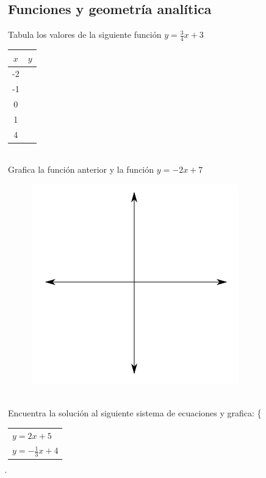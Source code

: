 \documentclass[a4paper,10pt]{article}
\begin{document}
\pagebreak

\subsection*{Funciones y geometría analítica}

Tabula los valores de la siguiente función  $y=\frac{3}{4}x+3$
\vspace{.5cm}\\
\begin{tabular}{|c|c|}\hline
$x$ & $y$ \\ \hline
 -2   &      \\ \hline
 -1   &      \\ \hline
 0   &       \\ \hline
 1   &       \\ \hline
4   &       \\ \hline
\end{tabular}
\vspace{0.5cm}\\

Grafica la función anterior y la función $y=-2x+7$
\begin{figure}[H]
\includegraphics[scale=0.5]{plot.png}
\end{figure}
\vspace{0.5cm}\\

Encuentra la solución al siguiente sistema de ecuaciones y grafica:
\left\{\begin{tabular}{l}
$y=2x+5$\\
$y=-\frac{1}{3}x+4$\\
\end{tabular}\right\.
\end{document}
